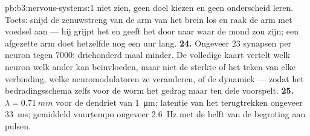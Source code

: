 \begin{solution}{pb:b3:nervous-systems:1}
niet zien, geen doel kiezen en geen onderscheid leren. Toets: snijd de
zenuwstreng van de arm van het brein los en raak de arm met voedsel aan
--- hij grijpt het en geeft het door naar waar de mond zou zijn; een
afgezette arm doet hetzelfde nog een uur lang.
\textbf{24.} Ongeveer $23$ synapsen per neuron tegen $7000$: driehonderd
maal minder. De volledige kaart vertelt welk neuron welk ander kan
beïnvloeden, maar niet de sterkte of het teken van elke verbinding,
welke neuromodulatoren ze veranderen, of de dynamiek --- zodat het
bedradingsschema zelfs voor de worm het gedrag maar ten dele voorspelt.
\textbf{25.} $\lambda = \qty{0.71}{mm}$ voor de dendriet van
\qty{1}{\micro m}; latentie van het terugtrekken ongeveer \qty{33}{ms};
gemiddeld vuurtempo ongeveer \qty{2.6}{Hz} met de helft van de
begroting aan pulsen.
\end{solution}
